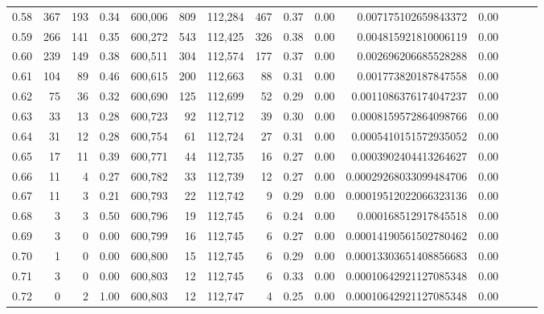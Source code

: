 \begin{tabular}{rrrrrrrrrrrrrrr}
0.58 &      367 &     193 &  0.34 &  600,006 &      809 &  112,284 &      467 &  0.37 &  0.00 &    0.007175102659843372 &      0.00 \\
0.59 &      266 &     141 &  0.35 &  600,272 &      543 &  112,425 &      326 &  0.38 &  0.00 &    0.004815921810006119 &      0.00 \\
0.60 &      239 &     149 &  0.38 &  600,511 &      304 &  112,574 &      177 &  0.37 &  0.00 &    0.002696206685528288 &      0.00 \\
0.61 &      104 &      89 &  0.46 &  600,615 &      200 &  112,663 &       88 &  0.31 &  0.00 &    0.001773820187847558 &      0.00 \\
0.62 &       75 &      36 &  0.32 &  600,690 &      125 &  112,699 &       52 &  0.29 &  0.00 &   0.0011086376174047237 &      0.00 \\
0.63 &       33 &      13 &  0.28 &  600,723 &       92 &  112,712 &       39 &  0.30 &  0.00 &   0.0008159572864098766 &      0.00 \\
0.64 &       31 &      12 &  0.28 &  600,754 &       61 &  112,724 &       27 &  0.31 &  0.00 &   0.0005410151572935052 &      0.00 \\
0.65 &       17 &      11 &  0.39 &  600,771 &       44 &  112,735 &       16 &  0.27 &  0.00 &   0.0003902404413264627 &      0.00 \\
0.66 &       11 &       4 &  0.27 &  600,782 &       33 &  112,739 &       12 &  0.27 &  0.00 &  0.00029268033099484706 &      0.00 \\
0.67 &       11 &       3 &  0.21 &  600,793 &       22 &  112,742 &        9 &  0.29 &  0.00 &  0.00019512022066323136 &      0.00 \\
0.68 &        3 &       3 &  0.50 &  600,796 &       19 &  112,745 &        6 &  0.24 &  0.00 &    0.000168512917845518 &      0.00 \\
0.69 &        3 &       0 &  0.00 &  600,799 &       16 &  112,745 &        6 &  0.27 &  0.00 &  0.00014190561502780462 &      0.00 \\
0.70 &        1 &       0 &  0.00 &  600,800 &       15 &  112,745 &        6 &  0.29 &  0.00 &  0.00013303651408856683 &      0.00 \\
0.71 &        3 &       0 &  0.00 &  600,803 &       12 &  112,745 &        6 &  0.33 &  0.00 &  0.00010642921127085348 &      0.00 \\
0.72 &        0 &       2 &  1.00 &  600,803 &       12 &  112,747 &        4 &  0.25 &  0.00 &  0.00010642921127085348 &      0.00 \\

\end{tabular}
